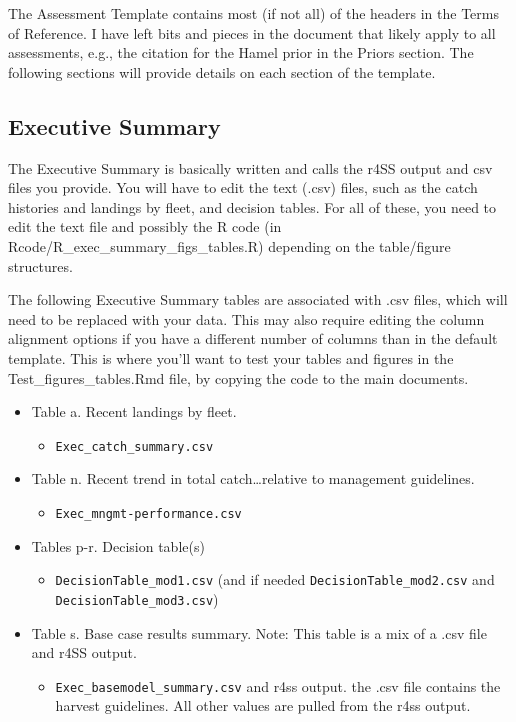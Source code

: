 \documentclass[12pt,]{article}
\providecommand{\tightlist}{%
  \setlength{\itemsep}{0pt}\setlength{\parskip}{0pt}}
\begin{document}
The Assessment Template contains most (if not all) of the headers in the
Terms of Reference. I have left bits and pieces in the document that
likely apply to all assessments, e.g., the citation for the Hamel prior
in the Priors section. The following sections will provide details on
each section of the template.

\subsection{Executive Summary}\label{executive-summary}

The Executive Summary is basically written and calls the r4SS output and
csv files you provide. You will have to edit the text (.csv) files, such
as the catch histories and landings by fleet, and decision tables. For
all of these, you need to edit the text file and possibly the R code (in
Rcode/R\_exec\_summary\_figs\_tables.R) depending on the table/figure
structures.

The following Executive Summary tables are associated with .csv files,
which will need to be replaced with your data. This may also require
editing the column alignment options if you have a different number of
columns than in the default template. This is where you'll want to test
your tables and figures in the Test\_figures\_tables.Rmd file, by
copying the code to the main documents.

\begin{itemize}
\tightlist
\item
  Table a. Recent landings by fleet.

  \begin{itemize}
  \tightlist
  \item
    \texttt{Exec\_catch\_summary.csv}
  \end{itemize}
\item
  Table n. Recent trend in total catch\ldots{}relative to management
  guidelines.

  \begin{itemize}
  \tightlist
  \item
    \texttt{Exec\_mngmt-performance.csv}
  \end{itemize}
\item
  Tables p-r. Decision table(s)

  \begin{itemize}
  \tightlist
  \item
    \texttt{DecisionTable\_mod1.csv} (and if needed
    \texttt{DecisionTable\_mod2.csv} and
    \texttt{DecisionTable\_mod3.csv})
  \end{itemize}
\item
  Table s. Base case results summary. Note: This table is a mix of a
  .csv file and r4SS output.

  \begin{itemize}
  \tightlist
  \item
    \texttt{Exec\_basemodel\_summary.csv} and r4ss output. the .csv file
    contains the harvest guidelines. All other values are pulled from
    the r4ss output.
  \end{itemize}
\end{itemize}
\end{document}
